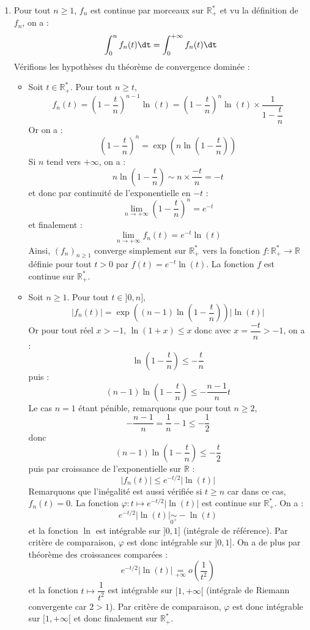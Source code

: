 \documentclass[a4paper,10pt]{report}
\begin{document}
\corr \begin{enumerate}
\item Pour tout $n \geq 1$, $f_n$ est continue par morceaux sur $\mathbb{R}_+^{*}$ et vu la définition de $f_n$, on a :
$$ \int_{0}^n f_n(t) \dt  = \int_{0}^{+ \infty} f_n(t) \dt$$
Vérifions les hypothèses du théorème de convergence dominée :
\begin{itemize}
\item Soit $t \in \mathbb{R}_+^{*}$. Pour tout $n \geq t$,
$$ f_n(t) = \left( 1 - \dfrac{t}{n} \right)^{n-1}\ln(t) = \left( 1 - \dfrac{t}{n} \right)^{n}\ln(t) \times \dfrac{1}{1-\dfrac{t}{n}}$$
Or on a :
$$  \left( 1 - \dfrac{t}{n} \right)^{n} = \exp \left( n \ln \left( 1 - \dfrac{t}{n} \right)\right)$$
Si $n$ tend vers $+ \infty$, on a :
$$ n \ln \left( 1 - \dfrac{t}{n} \right) \sim n \times \dfrac{-t}{n} = -t$$
et donc par continuité de l'exponentielle en $-t$ :
$$ \lim_{n \rightarrow + \infty} \left( 1 - \dfrac{t}{n} \right)^{n} = e^{-t}$$
et finalement :
$$ \lim_{n \rightarrow + \infty} f_n(t) = e^{-t} \ln(t)$$
Ainsi, $(f_n)_{n \geq 1}$ converge simplement sur $\mathbb{R}_+^{*}$ vers la fonction $f: \mathbb{R}_+^{*} \rightarrow \mathbb{R}$ définie pour tout $t>0$ par $f(t) =e^{-t} \ln(t)$. La fonction $f$ est continue sur $\mathbb{R}_+^{*}$.
\item Soit $n \geq 1$. Pour tout $t \in ]0,n]$,
$$ \vert f_n(t) \vert =  \exp \left( (n-1) \ln \left( 1 - \dfrac{t}{n} \right)\right) \vert \ln(t) \vert$$
Or pour tout réel $x>-1$, $\ln(1+x) \leq x$ donc avec $x= \dfrac{-t}{n}>-1$, on a :
$$ \ln \left( 1 - \dfrac{t}{n} \right) \leq - \dfrac{t}{n}$$
puis :
$$ (n-1) \ln \left( 1 - \dfrac{t}{n} \right) \leq - \dfrac{n-1}{n} t $$
Le cas $n=1$ étant pénible, remarquons que pour tout $n \geq 2$,
$$ - \dfrac{n-1}{n} = \dfrac{1}{n} - 1 \leq -\dfrac{1}{2}$$
donc 
$$ (n-1) \ln \left( 1 - \dfrac{t}{n}\right) \leq  - \dfrac{t}{2} $$
puis par croissance de l'exponentielle sur $\mathbb{R}$ :
$$ \vert f_n(t) \vert \leq e^{-t/2} \vert \ln(t) \vert $$
Remarquons que l'inégalité est aussi vérifiée si $t \geq n$ car dans ce cas, $f_n(t)=0$. La fonction $ \varphi : t \mapsto e^{-t/2} \vert \ln(t) \vert$ est continue sur $\mathbb{R}_+^{*}$. On a :
$$ e^{-t/2} \vert \ln(t) \vert \underset{0^+}{\sim} -\ln(t)$$
et la fonction $\ln$ est intégrable sur $]0,1]$ (intégrale de référence). Par critère de comparaison, $\varphi$ est donc intégrable sur $]0,1]$. On a de plus par théorème des croissances comparées :
$$ e^{-t/2} \vert \ln(t) \vert \underset{+ \infty}{=} o \left( \dfrac{1}{t^2} \right)$$
et la fonction $t \mapsto \dfrac{1}{t^2}$ est intégrable sur $[1, + \infty[$ (intégrale de Riemann convergente car $2>1$). Par critère de comparaison, $\varphi$ est donc intégrable sur $[1, + \infty[$ et donc finalement sur $\mathbb{R}_+^{*}$.

\end{itemize}
\end{enumerate}
\end{document}
